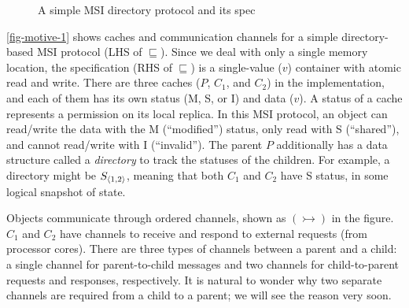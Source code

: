 \documentclass[sigplan,10pt,review,anonymous,screen]{acmart}\settopmatter{printfolios=true,printccs=false,printacmref=false}
\begin{document}
\begin{figure}[h]
  \caption{A simple MSI directory protocol and its spec}
  \vspace{-5pt}
  \label{fig-motive-1}
\end{figure}

\autoref{fig-motive-1} shows caches and communication channels for a simple directory-based MSI protocol (LHS of $\sqsubseteq$).
Since we deal with only a single memory location, the specification (RHS of $\sqsubseteq$) is a single-value ($v$) container with atomic read and write.
There are three caches ($P$, $C_1$, and $C_2$) in the implementation, and each of them has its own status (M, S, or I) and data ($v$).
A status of a cache represents a permission on its local replica.
In this MSI protocol, an object can read/write the data with the M (``modified'') status, only read with S (``shared''), and cannot read/write with I (``invalid'').
The parent $P$ additionally has a data structure called a \emph{directory} to track the statuses of the children.
For example, a directory might be $S_{\langle 1, 2 \rangle}$, meaning that both $C_1$ and $C_2$ have S status, in some logical snapshot of state.

Objects communicate through ordered channels, shown as $(\rightarrowtail)$ in the figure.
$C_1$ and $C_2$ have channels to receive and respond to external requests (from processor cores).
There are three types of channels between a parent and a child: a single channel for parent-to-child messages and two channels for child-to-parent requests and responses, respectively.
It is natural to wonder why two separate channels are required from a child to a parent; we will see the reason very soon.

\newcommand{\blackdiamond}{\raisebox{.4ex}{\ensuremath{\scriptscriptstyle\blacklozenge}}}
\end{document}

